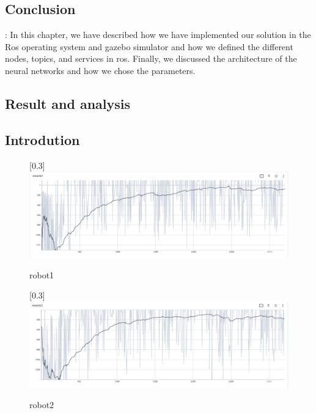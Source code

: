 \documentclass[12pt]{extarticle}
\begin{document}
\subsection{Conclusion}:
In this chapter, we have described how we have implemented our solution in the Ros operating system and gazebo simulator and how we defined the different nodes, topics, and services in ros. Finally, we discussed the architecture of the neural networks and how we chose the parameters.

\afterpage{\clearpage}





\newpage
\pagebreak
\hspace{0pt}
\vfill
\begin{center}
\section{Result and analysis}
\end{center}
\vfill
\hspace{0pt}

\pagebreak

\subsection{Introdution}
\begin{figure}[h]  
\begin{center}
\scalebox{0.3}[0.3]{
\includegraphics{robot1}
}

\caption[robot1]{robot1}

\end{center}

\end{figure}
\begin{figure}[h]  
\begin{center}
\scalebox{0.3}[0.3]{
\includegraphics{robot2}
}

\caption[robot2]{robot2}

\end{center}

\end{figure}
\end{document}
